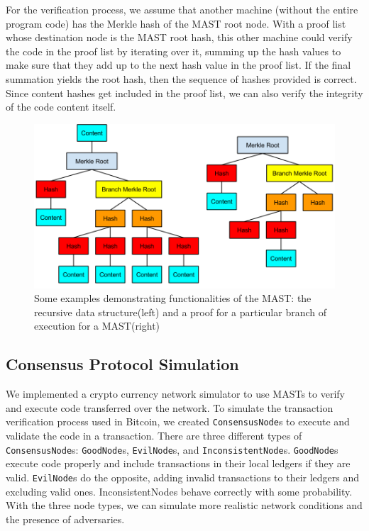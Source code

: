 \documentclass{vldb}
\begin{document}
For the verification process, we assume that another machine (without the entire program code) has the Merkle hash of the MAST root node. With a proof list whose destination node is the MAST root hash, this other machine could verify the code in the proof list by iterating over it, summing up the hash values to make sure that they add up to the next hash value in the proof list. If the final summation yields the root hash, then the sequence of hashes provided is correct. Since content hashes get included in the proof list, we can also verify the integrity of the code content itself.

\begin{figure}[h]
	\includegraphics[scale=.35]{mast}
	\caption{Some examples demonstrating functionalities of  the MAST: the recursive data structure(left) and a proof for a particular branch of execution for a MAST(right)}
	\label{mast}
\end{figure}

\subsection{Consensus Protocol Simulation}

We implemented a crypto currency network simulator to use MASTs to verify and execute code transferred over the network. To simulate the transaction verification process used in Bitcoin, we created \texttt{ConsensusNode}s to execute and validate the code in a transaction. There are three different types of \texttt{ConsensusNode}s: \texttt{GoodNode}s, \texttt{EvilNode}s, and \texttt{InconsistentNode}s. \texttt{GoodNode}s execute code properly and include transactions in their local ledgers if they are valid. \texttt{EvilNode}s do the opposite, adding invalid transactions to their ledgers and excluding valid ones. InconsistentNodes behave correctly with some probability. With the three node types, we can simulate more realistic network conditions and the presence of adversaries.
\end{document}
